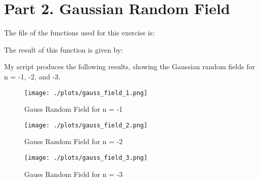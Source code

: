 \section{Part 2. Gaussian Random Field}

The file of the functions used for this exercise is:



The result of this function is given by:

My script produces the following results, showing the Gaussian random fields for n = -1, -2, and -3.


\begin{figure}[h!]
  \centering
  \texttt{[image: ./plots/gauss\_field\_1.png]}
  \caption{Gauss Random Field for n = -1}
  \label{fig:gauss1}
\end{figure}

\begin{figure}[h!]
  \centering
  \texttt{[image: ./plots/gauss\_field\_2.png]}
  \caption{Gauss Random Field for n = -2}
  \label{fig:gauss2}
\end{figure}

\begin{figure}[h!]
  \centering
  \texttt{[image: ./plots/gauss\_field\_3.png]}
  \caption{Gauss Random Field for n = -3}
  \label{fig:gauss3}
\end{figure}
